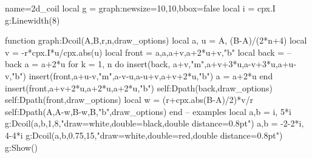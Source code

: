 \documentclass[10pt]{standalone}%
\begin{document}
\begin{luadraw}{name=2d_coil}
local g = graph:new{size={10,10},bbox=false}
local i = cpx.I
g:Linewidth(8)

function graph:Dcoil(A,B,r,n,draw_options)
    local a, u = A, (B-A)/(2*n+4)
    local v = -r*cpx.I*u/cpx.abs(u)
    local front = {a,a,a+v,a+2*u+v,"b"}
    local back = {} -- back
    a = a+2*u
    for k = 1, n do
        insert(back, {a+v,"m",a+v+3*u,a-v+3*u,a+u-v,"b"})
        insert(front,{a+u-v,"m",a-v-u,a-u+v,a+v+2*u,"b"})
        a = a+2*u
    end
    insert(front,{a+v+2*u,a+2*u,a+2*u,"b"})
    self:Dpath(back,draw_options)
    self:Dpath(front,draw_options)
    local w = (r+cpx.abs(B-A)/2)*v/r
    self:Dpath({A,A-w,B-w,B,"b"},draw_options)
end
-- examples
local a,b = i, 5*i
g:Dcoil(a,b,1,8,"draw=white,double=black,double distance=0.8pt")
a,b = -2-2*i, 4-4*i
g:Dcoil(a,b,0.75,15,"draw=white,double=red,double distance=0.8pt")
g:Show()            
\end{luadraw}
\end{document}
